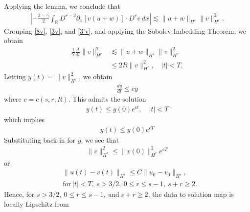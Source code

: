 \documentclass[12pt,reqno]{amsart}
\numberwithin{equation}{section}  %
\newcommand{\rr}{\mathbb{R}}
\newcommand{\p}{\partial}
\begin{document}
%
Applying the lemma, we conclude that
%
\begin{equation}
\begin{split}
\left | - \frac{3-\gamma}{2} \int_{\rr}  D^{r -2}
\p_x[v(u+w)] \cdot
D^r v \ dx  \right |
 \lesssim \|u+w \|_{H^{s}}
\|v\|_{H^r}^2.
\label{3'v}
\end{split}
\end{equation}
%
%
%
%
%
%
Grouping \eqref{8v}, \eqref{3v}, and \eqref{3'v}, and 
applying
the Sobolev Imbedding Theorem, we obtain
%
%
\begin{equation}
\begin{split}
\frac{1}{2} \frac{d}{dt}
\|v\|_{H^r}^2
& \lesssim \|u+w\|_{H^s}
\|v\|_{H^r}^2
\\
& \le 2R \| v \|_{H^{r}}^{2}, \quad | t | < T.
\label{9v}
\end{split}
\end{equation}
%
%
%
%
%
Letting $y(t) = \| v \|^{2}_{H^{r}}$, we obtain
%
%
%
\begin{equation*}
\begin{split}
  \frac{dy}{dt} \le cy
\end{split}
\end{equation*}
%
where $c = c(s, r, R)$. 
This admits the solution
%
%
\begin{equation*}
\begin{split}
  y(t) \le y(0) e^{ct}, \quad | t | < T
\end{split}
\end{equation*}
%
%
which implies
%
%
\begin{equation*}
\begin{split}
  y(t) \le y(0) e^{cT}
\end{split}
\end{equation*}
%
%
Substituting back in for $y$, we see that
%
%
\begin{equation*}
\begin{split}
  \| v \|_{H^{r}}^{2} \le \| v(0) \|^{2}_{H^{r}}e^{cT}
\end{split}
\end{equation*}
%
%
or
%
%
\begin{equation}
  \label{lip-ineq}
\begin{split}
  & \| u(t) - v(t) \|_{H^{r}} \le C \| u_{0} - v_{0} \|_{H^{r}}, 
  \\
  & \text{for} \ | t | < T,
  \ s > 3/2, \ 0 \le r \le s-1, \ s + r \ge 2.
\end{split}
\end{equation}
%
Hence, for $s > 3/2, \ 0 \le r \le s-1, \ \text{and} \ s + r \ge 2$, the data to solution map is locally Lipschitz from
\end{document}
